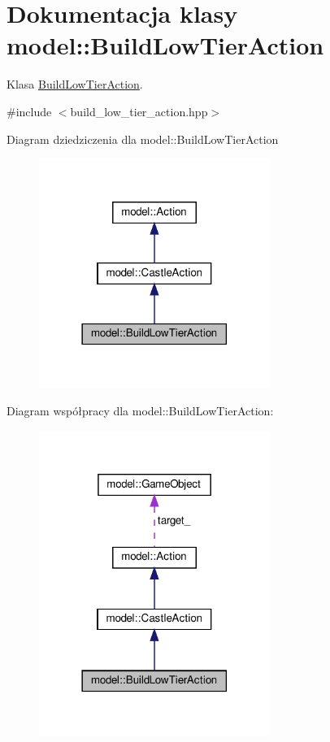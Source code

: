 \hypertarget{classmodel_1_1BuildLowTierAction}{}\section{Dokumentacja klasy model\+:\+:Build\+Low\+Tier\+Action}
\label{classmodel_1_1BuildLowTierAction}


Klasa \hyperlink{classmodel_1_1BuildLowTierAction}{Build\+Low\+Tier\+Action}.  




{\ttfamily \#include $<$build\+\_\+low\+\_\+tier\+\_\+action.\+hpp$>$}



Diagram dziedziczenia dla model\+:\+:Build\+Low\+Tier\+Action\nopagebreak
\begin{figure}[H]
\begin{center}
\leavevmode
\includegraphics[width=213pt]{classmodel_1_1BuildLowTierAction__inherit__graph}
\end{center}
\end{figure}


Diagram współpracy dla model\+:\+:Build\+Low\+Tier\+Action\+:\nopagebreak
\begin{figure}[H]
\begin{center}
\leavevmode
\includegraphics[width=213pt]{classmodel_1_1BuildLowTierAction__coll__graph}
\end{center}
\end{figure}
